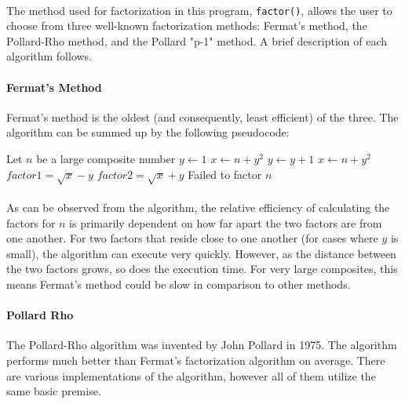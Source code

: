 \documentclass[12pt,a4paper]{article}
\begin{document}
\paragraph{}
The method used for factorization in this program, \verb|factor()|, allows the 
user to choose from three well-known factorization methods:  Fermat's method, 
the Pollard-Rho method, and the Pollard "p-1" method.  A brief description of 
each algorithm follows.

\paragraph{Fermat's Method}
Fermat's method is the oldest (and consequently, least efficient) of the three.  
The algorithm can be summed up by the following pseudocode:

\begin{algorithm}[H]
	\begin{algorithmic}
    \State Let $n$ be a large composite number
    \State $y \gets 1$
    \State $x \gets n + y^2$
      \State $y \gets y + 1$
      \State $x \gets n + y^2$
    \EndWhile
      \State $factor1 = \sqrt{x} - y$
      \State $factor2 = \sqrt{x} + y$
    \Else{}
      \State Failed to factor $n$
    \EndIf
	\end{algorithmic} 
\end{algorithm}

\paragraph{}
As can be observed from the algorithm, the relative efficiency of calculating 
the factors for $n$ is primarily dependent on how far apart the two factors are 
from one another.  For two factors that reside close to one another (for cases 
where $y$ is small), the algorithm can execute very quickly.  However, as the 
distance between the two factors grows, so does the execution time.  For very 
large composites, this means Fermat's method could be slow in comparison to 
other methods.

\paragraph{Pollard Rho}
The Pollard-Rho algorithm was invented by John Pollard in 1975.  The algorithm 
performs much better than Fermat's factorization algorithm on average.  There are 
various implementations of the algorithm, however all of them utilize the same 
basic premise.
\end{document}
